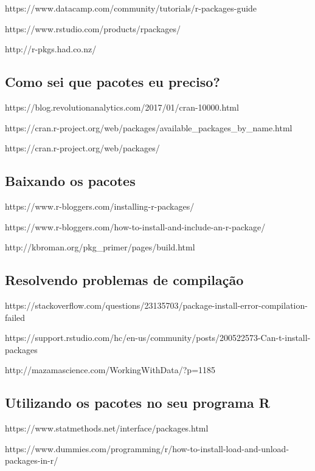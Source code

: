 https://www.datacamp.com/community/tutorials/r-packages-guide

https://www.rstudio.com/products/rpackages/

http://r-pkgs.had.co.nz/

\subsection{Como sei que pacotes eu preciso?}

https://blog.revolutionanalytics.com/2017/01/cran-10000.html

https://cran.r-project.org/web/packages/available\_packages\_by\_name.html

https://cran.r-project.org/web/packages/

\subsection{Baixando os pacotes}

https://www.r-bloggers.com/installing-r-packages/

https://www.r-bloggers.com/how-to-install-and-include-an-r-package/

http://kbroman.org/pkg\_primer/pages/build.html


\subsection{Resolvendo problemas de compilação}

https://stackoverflow.com/questions/23135703/package-install-error-compilation-failed

https://support.rstudio.com/hc/en-us/community/posts/200522573-Can-t-install-packages

http://mazamascience.com/WorkingWithData/?p=1185


\subsection{Utilizando os pacotes no seu programa R}

https://www.statmethods.net/interface/packages.html

https://www.dummies.com/programming/r/how-to-install-load-and-unload-packages-in-r/



